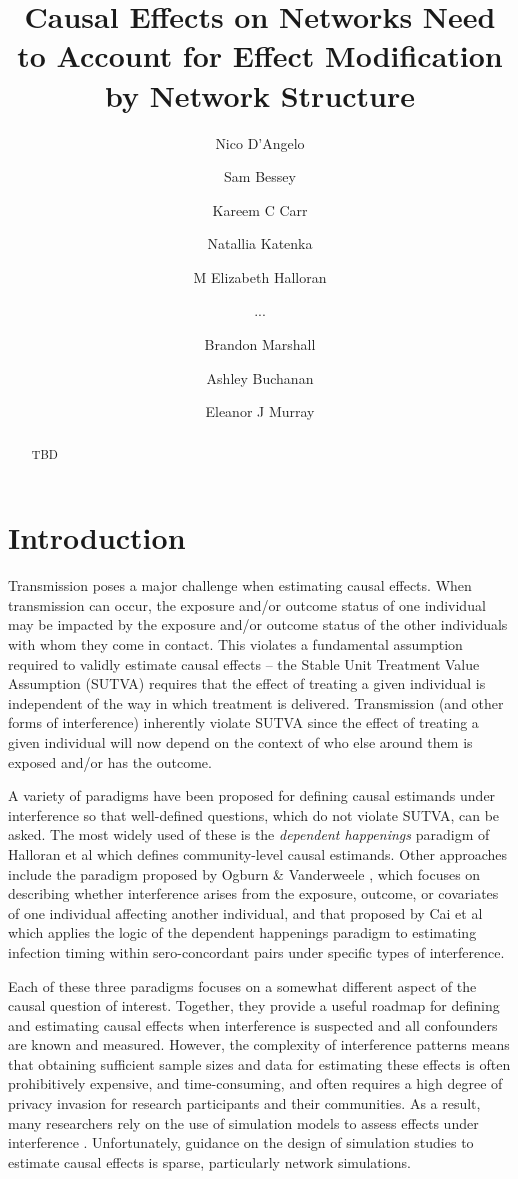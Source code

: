 \documentclass{article}
\author[1]{Nico D'Angelo}
\author[2]{Sam Bessey}
\author[3]{Kareem C Carr}
\author[4]{Natallia Katenka}
\author[5]{M Elizabeth Halloran}
\author[7]{...}
\author[2]{Brandon Marshall}
\author[6]{Ashley Buchanan}
\author[1]{Eleanor J Murray}
\affil[1]{Department of Epidemiology, Boston University School of Public Health, Boston MA, USA
}
\affil[2]{...}
\affil[3]{Department of Biostatistics, Harvard TH Chan School of Public Health, Harvard University, Boston, MA, USA}
\affil[4]{...}
\affil[5]{... }
\affil[6]{... }
\affil[7]{... }
\date{}
\theoremstyle{definition}
\begin{document}
\title{Causal Effects on Networks Need to Account for Effect Modification by Network Structure}

\maketitle

\begin{abstract}
TBD
\end{abstract}

\newpage


\section{Introduction}
Transmission poses a major challenge when estimating causal effects. When transmission can occur, the exposure and/or outcome status of one individual may be impacted by the exposure and/or outcome status of the other individuals with whom they come in contact. This violates a fundamental assumption required to validly estimate causal effects – the Stable Unit Treatment Value Assumption (SUTVA) requires that the effect of treating a given individual is independent of the way in which treatment is delivered. Transmission (and other forms of interference) inherently violate SUTVA since the effect of treating a given individual will now depend on the context of who else around them is exposed and/or has the outcome. 

A variety of paradigms have been proposed for defining causal estimands under interference so that well-defined questions, which do not violate SUTVA, can be asked. The most widely used of these is the \emph{dependent happenings} paradigm of Halloran et al  \cite{halloran_study_1991} which defines community-level causal estimands. Other approaches include the paradigm proposed by Ogburn \& Vanderweele \cite{ogburn_causal_2014}, which focuses on describing whether interference arises from the exposure, outcome, or covariates of one individual affecting another individual, and that proposed by Cai et al \cite{cai_causal_2021} which applies the logic of the dependent happenings paradigm to estimating infection timing within sero-concordant pairs under specific types of interference. 

Each of these three paradigms focuses on a somewhat different aspect of the causal question of interest. Together, they provide a useful roadmap for defining and estimating causal effects when interference is suspected and all confounders are known and measured. However, the complexity of interference patterns means that obtaining sufficient sample sizes and data for estimating these effects is often prohibitively expensive, and time-consuming, and often requires a high degree of privacy invasion for research participants and their communities. As a result, many researchers rely on the use of simulation models to assess effects under interference \cite{murray_emulating_2021, buchanan_disseminated_2021}. Unfortunately, guidance on the design of simulation studies to estimate causal effects is sparse, particularly network simulations.
\end{document}
